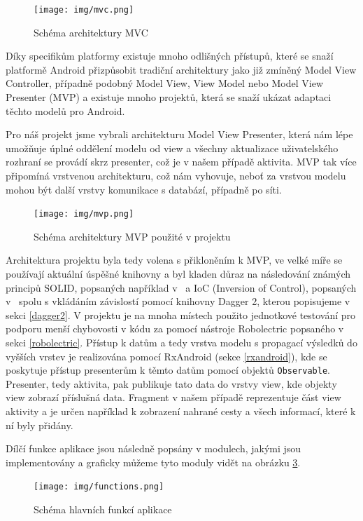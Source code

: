 \documentclass[czech,master,public,dept460,male,java,cpdeclaration]{diploma}
\begin{document}
\begin{figure}[H]
        \centering
                \texttt{[image: img/mvc.png]}
        \caption{Schéma architektury MVC}
        \label{fig:mvc}
\end{figure}

Díky specifikům platformy existuje mnoho odlišných přístupů, které se snaží platformě Android přizpůsobit
tradiční architektury jako již zmíněný Model View Controller, případně podobný Model View, View Model
nebo Model View Presenter (MVP) a existuje mnoho projektů, která se snaží ukázat adaptaci těchto modelů
pro Android.

Pro náš projekt jsme vybrali architekturu Model View Presenter, která nám lépe umožňuje
úplné oddělení modelu od view a všechny aktualizace uživatelského rozhraní se provádí skrz presenter,
 což je v našem případě aktivita. MVP tak více připomíná vrstvenou architekturu, což nám vyhovuje, neboť
za vrstvou modelu mohou být další vrstvy komunikace s databází, případně po síti.

\begin{figure}[H]
        \centering
                \texttt{[image: img/mvp.png]}
        \caption{Schéma architektury MVP použité v projektu}
        \label{fig:mvp}
\end{figure}

Architektura projektu byla tedy volena s přikloněním k MVP, ve velké míře se používají
aktuální úspěšné knihovny a byl kladen důraz na následování známých principů SOLID, popsaných
například v~\cite{solid} a IoC (Inversion of Control), popsaných v~\cite{ioc} spolu s vkládáním
závislostí pomocí knihovny Dagger 2, kterou popisujeme v sekci \ref{dagger2}.
V projektu je na mnoha místech použito jednotkové testování pro podporu menší chybovosti v kódu
za pomocí nástroje Robolectric popsaného v sekci \ref{robolectric}. Přístup k datům a tedy
vrstva modelu s propagací výsledků do vyšších vrstev je realizována
 pomocí RxAndroid (sekce \ref{rxandroid}), kde se poskytuje přístup
presenterům k těmto datům pomocí objektů \texttt{Observable}. Presenter, tedy aktivita,
pak publikuje tato data do vrstvy view, kde objekty view zobrazí příslušná data. Fragment v našem
případě reprezentuje část view aktivity a je určen například k zobrazení nahrané cesty a všech informací,
které k ní byly přidány.

Dílčí funkce aplikace jsou následně popsány v modulech, jakými jsou implementovány a graficky můžeme tyto moduly vidět
na obrázku \ref{fig:functions}.

\begin{figure}[H]
        \centering
                \texttt{[image: img/functions.png]}
        \caption{Schéma hlavních funkcí aplikace}
        \label{fig:functions}
\end{figure}
\end{document}
